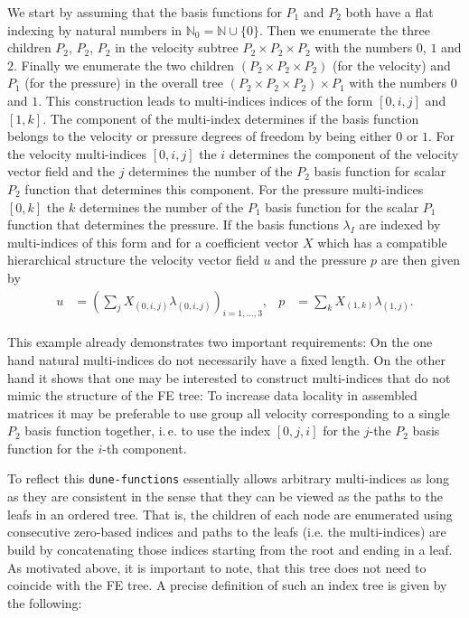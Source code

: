 \documentclass[a4paper,10pt,headings=normal,bibliography=totoc]{scrartcl}
\newcommand{\N}{\mathbb{N}}
\newcommand{\dunemodule}[1]{\texttt{#1}}
\begin{document}
We start by assuming that the basis functions for $P_1$ and $P_2$
both have a flat indexing by natural numbers in $\N_0 = \N \cup \{0\}$.
Then we enumerate the three children $P_2$, $P_2$, $P_2$
in the velocity subtree $P_2 \times P_2 \times P_2$
with the numbers $0$, $1$ and $2$.
Finally we enumerate the two children $(P_2 \times P_2 \times P_2)$ (for the velocity)
and $P_1$ (for the pressure) in the overall tree $(P_2 \times P_2 \times P_2) \times P_1$
with the numbers $0$ and $1$.
This construction leads to multi-indices indices of the form $[0,i,j]$ and $[1,k]$.
The component of the multi-index determines if the basis function
belongs to the velocity or pressure degrees of freedom by being either $0$ or $1$.
For the velocity multi-indices $[0,i,j]$ the $i$ determines the component
of the velocity vector field and the $j$ determines the number of the $P_2$ basis
function for scalar $P_2$ function that determines this component.
For the pressure multi-indices $[0,k]$ the $k$ determines the number of the $P_1$ basis
function for the scalar $P_1$ function that determines the pressure.
If the basis functions $\lambda_I$ are indexed by multi-indices of this form
and for a coefficient vector $X$ which has a compatible hierarchical structure
the velocity vector field $u$ and the pressure $p$ are then given by
\begin{align*}
    u &= (\sum_{j} X_{(0,i,j)}\lambda_{(0,i,j)})_{i=1,\dots,3},  &
    p &= \sum_{k} X_{(1,k)}\lambda_{(1,j)}.
\end{align*} 

This example already demonstrates two important requirements:
On the one hand natural multi-indices do not necessarily have
a fixed length.
On the other hand it shows that one may be interested to construct multi-indices
that do not mimic the structure of the FE tree: To increase data locality in assembled
matrices it may be preferable to use group all velocity corresponding to a single
$P_2$ basis function together, i.\,e. to use the index $[0,j,i]$
for the $j$-the $P_2$ basis function for the $i$-th component.


To reflect this \dunemodule{dune-functions} essentially allows arbitrary
multi-indices as long as they are consistent in the sense that they
can be viewed as the paths to the leafs in an ordered tree.
That is, the children of each node are enumerated using consecutive zero-based
indices and paths to the leafs (i.e. the multi-indices) are build by concatenating
those indices starting from the root and ending in a leaf.
As motivated above, it is important to note, that this tree does not need to
coincide with the FE tree. A precise definition of such an index tree is given by
the following:
\end{document}
